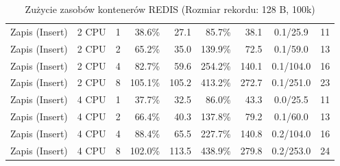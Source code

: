 \begin{table}[ht]
{\begin{tabular}{llcrrrrcc}
Zapis (Insert) & 2 CPU & 1 & 38.6\% & 27.1 & 85.7\% & 38.1 & 0.1/25.9 & 11 \\
Zapis (Insert) & 2 CPU & 2 & 65.2\% & 35.0 & 139.9\% & 72.5 & 0.1/59.0 & 13 \\
Zapis (Insert) & 2 CPU & 4 & 82.7\% & 59.6 & 254.2\% & 140.1 & 0.1/104.0 & 16 \\
Zapis (Insert) & 2 CPU & 8 & 105.1\% & 105.2 & 413.2\% & 272.7 & 0.1/251.0 & 23 \\
Zapis (Insert) & 4 CPU & 1 & 37.7\% & 32.5 & 86.0\% & 43.3 & 0.0/25.5 & 11 \\
Zapis (Insert) & 4 CPU & 2 & 66.4\% & 40.3 & 137.8\% & 79.2 & 0.1/60.0 & 13 \\
Zapis (Insert) & 4 CPU & 4 & 88.4\% & 65.5 & 227.7\% & 140.8 & 0.2/104.0 & 16 \\
Zapis (Insert) & 4 CPU & 8 & 102.0\% & 113.5 & 438.9\% & 279.8 & 0.2/253.0 & 24 \\
\bottomrule
\end{tabular}%
}
\caption{Zużycie zasobów kontenerów REDIS (Rozmiar rekordu: 128 B, 100k)}
\label{tab:resources_redis_small_100000}
\end{table}
